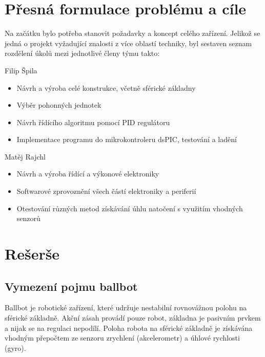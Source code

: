 \chapter{Přesná formulace problému a cíle}
\label{formulace}

Na začátku bylo potřeba stanovit požadavky a koncept celého zařízení. Jelikož se jedná o projekt vyžadující znalosti z více oblastí techniky, byl sestaven seznam rozdělení úkolů mezi jednotlivé členy týmu takto: \newline

\noindent Filip Špila

\begin{itemize}
\item Návrh a výroba celé konstrukce, včetně sférické základny
\item Výběr pohonných jednotek
\item Návrh řídícího algoritmu pomocí PID regulátoru
\item Implementace programu do mikrokontroleru dsPIC, testování a ladění

\end{itemize}

\noindent Matěj Rajchl

\begin{itemize}
\item Návrh a výroba řídící a výkonové elektroniky
\item Softwarové zprovoznění všech částí elektroniky a periferií
\item Otestování různých metod získávání úhlu natočení s využitím vhodných senzorů

\end{itemize}


\newpage


\chapter{Rešerše}
\label{reserse}


\section{Vymezení pojmu ballbot}
\label{ballbot}

Ballbot je robotické zařízení, které udržuje nestabilní rovnovážnou polohu na sférické základně. Akční zásah provádí pouze robot, základna je pasivním prvkem a nijak se na regulaci nepodílí. Poloha robota na sférické základně je získávána vhodným přepočtem ze senzoru zrychlení (akcelerometr) a úhlové rychlosti (gyro).

